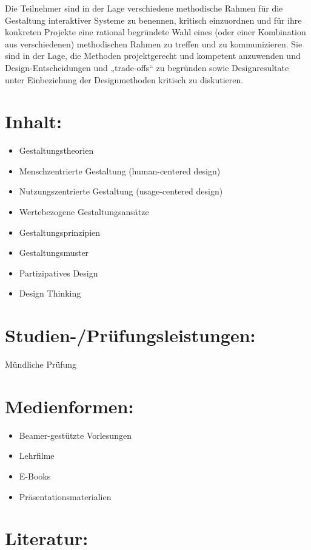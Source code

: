Die Teilnehmer sind in der Lage verschiedene methodische Rahmen für die
Gestaltung interaktiver Systeme zu benennen, kritisch einzuordnen und
für ihre konkreten Projekte eine rational begründete Wahl eines (oder
einer Kombination aus verschiedenen) methodischen Rahmen zu treffen und
zu kommunizieren. Sie sind in der Lage, die Methoden projektgerecht und
kompetent anzuwenden und Design-Entscheidungen und „trade-offs`` zu
begründen sowie Designresultate unter Einbeziehung der Designmethoden
kritisch zu diskutieren.

\section*{Inhalt:}\label{inhalt-4}

\begin{itemize}
\tightlist
\item
  Gestaltungstheorien
\item
  Menschzentrierte Gestaltung (human-centered design)
\item
  Nutzungszentrierte Gestaltung (usage-centered design)
\item
  Wertebezogene Gestaltungsansätze
\item
  Gestaltungsprinzipien
\item
  Gestaltungsmuster
\item
  Partizipatives Design
\item
  Design Thinking
\end{itemize}

\section*{Studien-/Prüfungsleistungen:}\label{studien-pruxfcfungsleistungen-4}

Mündliche Prüfung

\section*{Medienformen:}\label{medienformen-4}

\begin{itemize}
\tightlist
\item
  Beamer-gestützte Vorlesungen
\item
  Lehrfilme
\item
  E-Books
\item
  Präsentationsmaterialien
\end{itemize}

\section*{Literatur:}\label{literatur-4}

